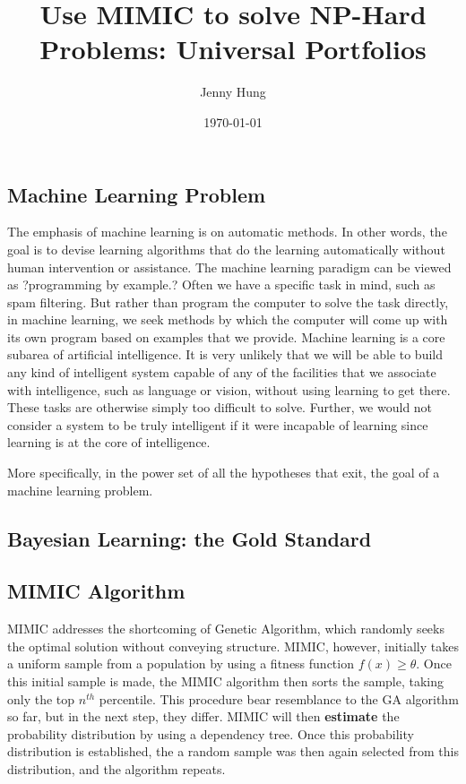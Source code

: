 \documentclass{article}
\begin{document}
\title{Use MIMIC to solve NP-Hard Problems: Universal Portfolios}
\author{Jenny Hung}
\date{\today}
\maketitle

\subsection*{Machine Learning Problem}
The emphasis of machine learning is on automatic methods. In other words, the goal is to devise learning algorithms that do the learning automatically without human intervention or assistance. The machine learning paradigm can be viewed as ?programming by example.? Often we have a specific task in mind, such as spam filtering. But rather than program the computer to solve the task directly, in machine learning, we seek methods by which the computer will come up with its own program based on examples that we provide. Machine learning is a core subarea of artificial intelligence. It is very unlikely that we will be able to build any kind of intelligent system capable of any of the facilities that we associate with intelligence, such as language or vision, without using learning to get there. These tasks are otherwise simply too difficult to solve. Further, we would not consider a system to be truly intelligent if it were incapable of learning since learning is at the core of
intelligence. 

More specifically, in the power set of all the hypotheses that exit, the goal of a machine learning problem.



\subsection*{Bayesian Learning: the Gold Standard}




\subsection*{MIMIC Algorithm}
MIMIC addresses the shortcoming of Genetic Algorithm, which randomly seeks the optimal solution without conveying structure. MIMIC, however, initially takes a uniform sample from a population by using a fitness function $f(x) \ge \theta$. Once this initial sample is made, the MIMIC algorithm then sorts the sample, taking only the top $n^{th}$ percentile. This procedure bear resemblance to the GA algorithm so far, but in the next step, they differ. MIMIC will then \textbf{estimate} the probability distribution by using a dependency tree. Once this probability distribution is established, the a random sample was then again selected from this distribution, and the algorithm repeats. 
\end{document}
